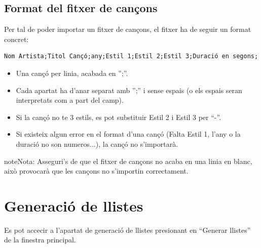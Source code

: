 \documentclass[a4paper,10pt,oneside]{sphinxmanual}
\begin{document}
\section{Format del fitxer de cançons}
\label{gest_cancons:format-del-fitxer-de-cancons}
Per tal de poder importar un fitxer de cançons, el fitxer ha de seguir un format concret:

\begin{Verbatim}[commandchars=\\\{\}]
Nom Artista;Titol Cançó;any;Estil 1;Estil 2;Estil 3;Duració en segons;
\end{Verbatim}
\begin{itemize}
\item {} 
Una cançó per linia, acabada en '';''.

\item {} 
Cada apartat ha d'anar separat amb '';'' i sense espais (o els espais seran interpretats com a part del camp).

\item {} 
Si la cançó no te 3 estils, es pot substituir Estil 2 i Estil 3 per ``-''.

\item {} 
Si existeix algun error en el format d'una cançó (Falta Estil 1, l'any o la duració no son numeros...), la cançó no s'importarà.

\end{itemize}

\begin{notice}{note}{Nota:}
Asseguri's de que el fitxer de cançons no acaba en una linia en blanc, això provocarà que les cançons no s'importin correctament.
\end{notice}


\chapter{Generació de llistes}
\label{gen_llistes:generacio-de-llistes}\label{gen_llistes::doc}
Es pot accecir a l'apartat de generació de llistes presionant en ``Generar llistes'' de la finestra principal.
\end{document}
